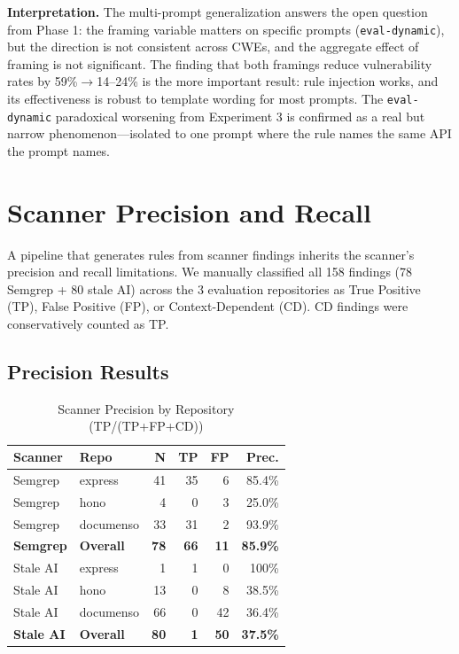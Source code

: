 \documentclass[conference,10pt]{IEEEtran}
\begin{document}
\textbf{Interpretation.} The multi-prompt generalization answers the open question from Phase 1: the framing variable matters on specific prompts (\texttt{eval-dynamic}), but the direction is not consistent across CWEs, and the aggregate effect of framing is not significant. The finding that both framings reduce vulnerability rates by 59\%$\rightarrow$14--24\% is the more important result: rule injection works, and its effectiveness is robust to template wording for most prompts. The \texttt{eval-dynamic} paradoxical worsening from Experiment 3 is confirmed as a real but narrow phenomenon---isolated to one prompt where the rule names the same API the prompt names.

\section{Scanner Precision and Recall}
\label{sec:scanner-precision}

A pipeline that generates rules from scanner findings inherits the scanner's precision and recall limitations. We manually classified all 158 findings (78 Semgrep + 80 stale AI) across the 3 evaluation repositories as True Positive (TP), False Positive (FP), or Context-Dependent (CD). CD findings were conservatively counted as TP.

\subsection{Precision Results}

\begin{table}[h]
\centering
\caption{Scanner Precision by Repository (TP/(TP+FP+CD))}
\label{tab:precision}
\begin{tabular}{llrrrr}
\toprule
\textbf{Scanner} & \textbf{Repo} & \textbf{N} & \textbf{TP} & \textbf{FP} & \textbf{Prec.} \\
\midrule
Semgrep & express & 41 & 35 & 6 & 85.4\% \\
Semgrep & hono & 4 & 0 & 3 & 25.0\% \\
Semgrep & documenso & 33 & 31 & 2 & 93.9\% \\
\textbf{Semgrep} & \textbf{Overall} & \textbf{78} & \textbf{66} & \textbf{11} & \textbf{85.9\%} \\
\midrule
Stale AI & express & 1 & 1 & 0 & 100\% \\
Stale AI & hono & 13 & 0 & 8 & 38.5\% \\
Stale AI & documenso & 66 & 0 & 42 & 36.4\% \\
\textbf{Stale AI} & \textbf{Overall} & \textbf{80} & \textbf{1} & \textbf{50} & \textbf{37.5\%} \\
\bottomrule
\end{tabular}
\end{table}
\end{document}
